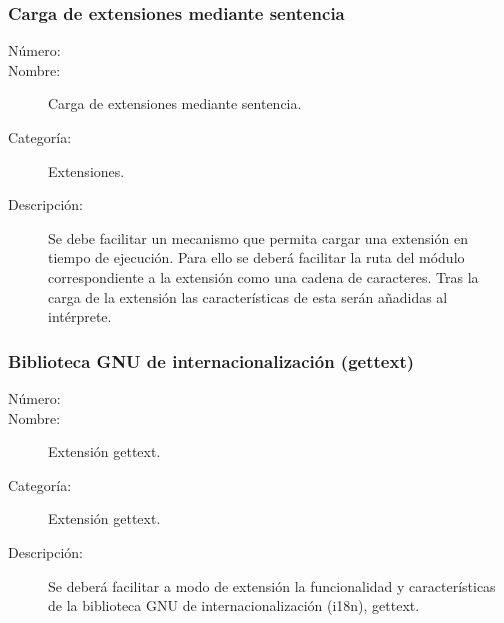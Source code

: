 \subsubsection{Carga de extensiones mediante sentencia}
	\begin{description}
		\item [Número:] \cn
		\item [Nombre:] Carga de extensiones mediante sentencia.
		\item [Categoría:] Extensiones.
		\item [Descripción:] Se debe facilitar un mecanismo que permita cargar una extensión en tiempo de ejecución. Para ello se deberá
      facilitar la ruta del módulo correspondiente a la extensión como una cadena de caracteres. Tras la carga de la extensión las 
      características de esta serán añadidas al intérprete.
	\end{description}

\subsubsection{Biblioteca GNU de internacionalización (gettext)}
	\begin{description}
		\item [Número:] \cn
		\item [Nombre:] Extensión gettext.
		\item [Categoría:] Extensión gettext.
		\item [Descripción:] Se deberá facilitar a modo de extensión la funcionalidad y características de la 
      biblioteca GNU de internacionalización (i18n), gettext. 
	\end{description}
